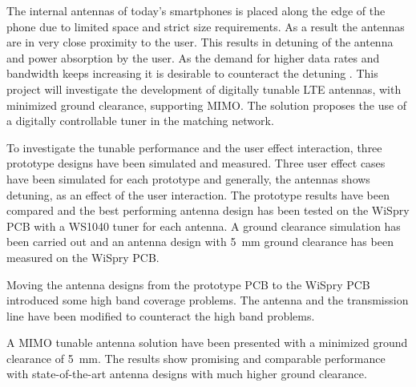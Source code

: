 \noindent
The internal antennas of today's smartphones is placed along the edge of the phone due to limited space and strict size requirements. As a result the antennas are in very close proximity to the user. This results in detuning of the antenna and power absorption by the user. As the demand for higher data rates and bandwidth keeps increasing it is desirable to counteract the detuning \cite{hilbert2015tradeoff}.     
This project will investigate the development of digitally tunable LTE antennas, with minimized ground clearance, supporting MIMO.
The solution proposes the use of a digitally controllable tuner in the
matching network.

To investigate the tunable performance and the user effect interaction, three prototype designs have been simulated and measured. Three user effect cases have been simulated for each prototype and generally, the antennas shows detuning, as an effect of the user interaction. 
The prototype results have been compared and the best performing antenna design has been tested on the WiSpry PCB with a WS1040 tuner for each antenna.
A ground clearance simulation has been carried out and an antenna design with \SI{5}{mm} ground clearance has been measured on the WiSpry PCB.  

Moving the antenna designs from the prototype PCB to the WiSpry PCB introduced some high band coverage problems. The antenna and the transmission line have been modified to counteract the high band problems.  

A MIMO tunable antenna solution have been presented with a minimized ground clearance of \SI{5}{mm}. The results show promising and comparable performance with state-of-the-art antenna designs with much higher ground clearance.    

